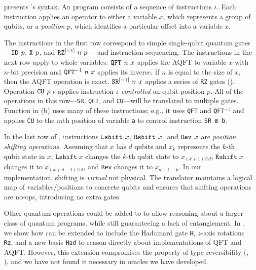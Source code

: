  presents \oqasm's syntax. An \oqasm program consists of
a sequence of instructions $\instr$. Each instruction applies an
operator to either a variable $x$, which represents a group of qubits,
or a \emph{position} $p$, which identifies a particular offset into a variable $x$. 

The instructions in the first row correspond to simple single-qubit
quantum gates---$\iskip{p}$, $\inot{p}$, and $\irz[\lbrack -1 \rbrack]{n}{p}$
 ---and instruction sequencing.
The instructions in the next row apply to whole variables: $\iqft{n}{x}$
applies the AQFT to variable $x$ with $n$-bit precision and
$\iqft[-1]{n}{x}$ applies its inverse.
If $n$ is equal to the size of $x$, then the AQFT operation is exact.
$\isr[\lbrack -1 \rbrack]{n}{x}$
applies a series of \texttt{RZ} gates (). 
Operation $\ictrl{p}{\instr}$
applies instruction $\instr$ \emph{controlled} on qubit position
$p$. All of the operations in this row---\texttt{SR}, \texttt{QFT}, and \texttt{CU}---will be translated to multiple \sqir
gates. Function  in (b) uses
many of these instructions; e.g., it uses \texttt{QFT} and \texttt{QFT}$^{-1}$ and applies
\texttt{CU} to the $m$th position of variable \texttt{a} to control
instruction \texttt{SR m b}.

In the last row of , instructions $\ilshift{x}$,
$\irshift{x}$, and $\irev{x}$ are \emph{position shifting operations}.
Assuming that $x$ has $d$ qubits and $x_k$ represents the $k$-th qubit
state in $x$, $\texttt{Lshift}\;x$ changes the $k$-th qubit state to
$x_{(k + 1)\% d}$, $\texttt{Rshift}\;x$ changes it to
$x_{(k + d - 1)\% d}$, and \texttt{Rev} changes it to $x_{d-1-k}$. In
our implementation, shifting is \emph{virtual} not physical. The \oqasm
translator maintains a logical map of variables/positions to concrete
qubits and ensures that shifting operations are no-ops, introducing no extra gates.

Other quantum operations could be added to \oqasm to
allow reasoning about a larger class of quantum programs, while still
guaranteeing a lack of entanglement. In , we
show how \oqasm can be extended to include the Hadamard gate
\texttt{H}, $z$-axis rotations \texttt{Rz}, and a new basis
\texttt{Had} to reason directly about implementations of QFT and AQFT\@.
However, this extension compromises the property of type reversibility
(, ), and we have not found it necessary in
oracles we have developed.

